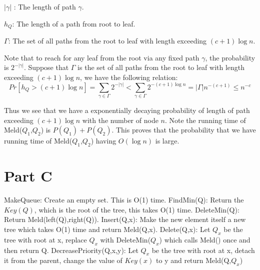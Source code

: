 \documentclass[11pt]{article}
\begin{document}
\noindent $|\gamma|$ : The length of path $\gamma$.

\noindent $h_Q$: The length of a path from root to leaf. 

\noindent $\Gamma$: The set of all paths from the root to leaf with length exceeding $(c+1)\log{n}$.

Note that to reach for any leaf from the root via any fixed path $\gamma$, the probability is $2^{-|\gamma|}$. Suppose that $\Gamma$ is the set of all paths from the root to leaf with length exceeding $(c+1)\log{n}$, we have the following relation:
\[
Pr[h_Q>(c+1)\log{n}]=\sum\limits_{\gamma\in\Gamma}2^{-|\gamma|}<\sum\limits_{\gamma\in\Gamma}2^{-(c+1)\log{n}}=|\Gamma|n^{-(c+1)}\leq n^{-c}
\]

Thus we see that we have a exponentially decaying probability of length of path exceeding $(c+1)\log{n}$ with the number of node $n$. Note the running time of Meld($Q_1$,$Q_2$) is $P(Q_1)+P(Q_2)$. This proves that the probability that we have running time of Meld($Q_1$,$Q_2$) having $O(\log{n})$ is large.

\section{Part C}
\noindent MakeQueue: Create an empty set. This is O(1) time.\newline
\noindent FindMin(Q): Return the $Key(Q)$, which is the root of the tree, this takes O(1) time.\newline
\noindent DeleteMin(Q): Return Meld(left(Q),right(Q)).\newline
\noindent Insert(Q,x): Make the new element itself a new tree which takes O(1) time and return Meld(Q,x). \newline
\noindent Delete(Q,x): Let $Q_x$ be the tree with root at x, replace $Q_x$ with DeleteMin($Q_x$) which calls Meld() once and then return Q.\newline
\noindent DecreasePriority(Q,x,y): Let $Q_x$ be the tree with root at x, detach it from the parent, change the value of $Key(x)$ to y and return Meld(Q,$Q_x$) 
\end{document}
